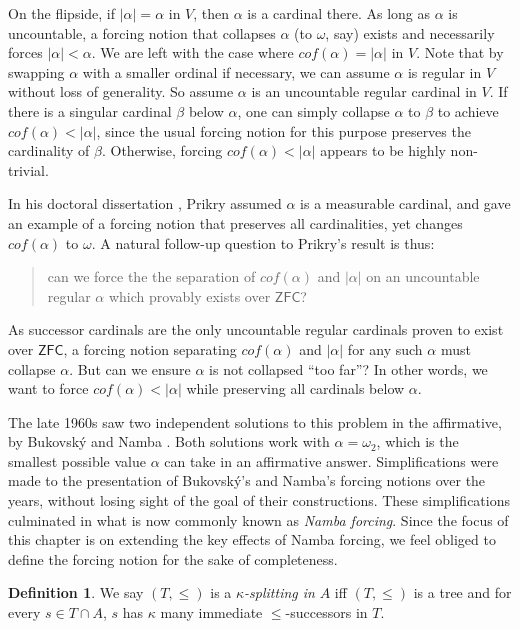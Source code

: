 \documentclass[12pt, twoside]{memoir}
\numberwithin{equation}{section}
\theoremstyle{definition}
\newtheorem{defi}[thm]{Definition}
\theoremstyle{remark}
\theoremstyle{definition}
\theoremstyle{definition}
\theoremstyle{definition}
\theoremstyle{remark}
\begin{document}
On the flipside, if $|\alpha| = \alpha$ in $V$, then $\alpha$ is a cardinal there. As long as $\alpha$ is uncountable, a forcing notion that collapses $\alpha$ (to $\omega$, say) exists and necessarily forces $|\alpha| < \alpha$. We are left with the case where $cof(\alpha) = |\alpha|$ in $V$. Note that by swapping $\alpha$ with a smaller ordinal if necessary, we can assume $\alpha$ is regular in $V$ without loss of generality. So assume $\alpha$ is an uncountable regular cardinal in $V$. If there is a singular cardinal $\beta$ below $\alpha$, one can simply collapse $\alpha$ to $\beta$ to achieve $cof(\alpha) < |\alpha|$, since the usual forcing notion for this purpose preserves the cardinality of $\beta$. Otherwise, forcing $cof(\alpha) < |\alpha|$ appears to be highly non-trivial.

In his doctoral dissertation \cite{prikry}, Prikry assumed $\alpha$ is a measurable cardinal, and gave an example of a forcing notion that preserves all cardinalities, yet changes $cof(\alpha)$ to $\omega$. A natural follow-up question to Prikry's result is thus:

\begin{quote}
    can we force the the separation of $cof(\alpha)$ and $|\alpha|$ on an uncountable regular $\alpha$ which provably exists over $\mathsf{ZFC}$?
\end{quote}

As successor cardinals are the only uncountable regular cardinals proven to exist over $\mathsf{ZFC}$, a forcing notion separating $cof(\alpha)$ and $|\alpha|$ for any such $\alpha$ must collapse $\alpha$. But can we ensure $\alpha$ is not collapsed ``too far''? In other words, we want to force $cof(\alpha) < |\alpha|$ while preserving all cardinals below $\alpha$.

The late 1960s saw two independent solutions to this problem in the affirmative, by Bukovsk\'{y} \cite{bukovsky} and Namba \cite{namba}. Both solutions work with $\alpha = \omega_2$, which is the smallest possible value $\alpha$ can take in an affirmative answer. Simplifications were made to the presentation of Bukovsk\'{y}'s and Namba's forcing notions over the years, without losing sight of the goal of their constructions. These simplifications culminated in what is now commonly known as \emph{Namba forcing}. Since the focus of this chapter is on extending the key effects of Namba forcing, we feel obliged to define the forcing notion for the sake of completeness.

\begin{defi}
We say $(T, \leq)$ is a $\kappa$\emph{-splitting in} $A$ iff $(T, \leq)$ is a tree and for every $s \in T \cap A$, $s$ has $\kappa$ many immediate $\leq$-successors in $T$. 
\end{defi}
\end{document}
